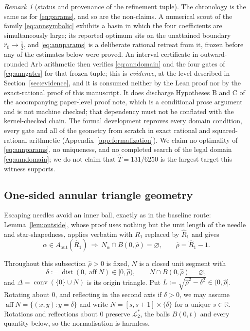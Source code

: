 \documentclass[11pt]{article}
\theoremstyle{plain}
\theoremstyle{definition}
\theoremstyle{remark}
\newtheorem{remark}[theorem]{Remark}
\newcommand{\R}{\mathbb{R}}
\newcommand{\Lout}{\mathcal{L}^{*}_{2}}
\newcommand{\conv}{\operatorname{conv}}
\newcommand{\Aout}{A_{\mathrm{out}}}
\begin{document}
\begin{remark}[status and provenance of the refinement tuple]\label{rem:annprov}
The chronology is the same as for \eqref{eq:params}, and so are the
non-claims. A numerical scout of the family
\eqref{eq:annsymbolic} exhibits a basin in which the four coefficients are
simultaneously large; its reported optimum sits on the unattained boundary
$\hat r_{0}\to\tfrac12$, and \eqref{eq:annparams} is a deliberate rational
retreat from it, frozen before any of the estimates below were proved. An
interval certificate in outward-rounded Arb arithmetic then verifies
\eqref{eq:anndomain} and the four gates of \eqref{eq:anngates} for that frozen
tuple; this is \emph{evidence}, at the level described in
Section~\ref{sec:evidence}, and it is consumed neither by the Lean proof nor by
the exact-rational proof of this manuscript. It does discharge Hypotheses B
and C of the accompanying paper-level proof note, which is a conditional prose
argument and is not machine checked; that dependency must not be conflated with
the kernel-checked chain. The formal development reproves every domain
condition, every gate and all of the geometry from scratch in exact rational and
squared-rational arithmetic (Appendix~\ref{app:formalization}). We claim no optimality of
\eqref{eq:annparams}, no uniqueness, and no completed search of the legal
domain \eqref{eq:anndomain}; we do not claim that $\hat T=131/6250$ is the
largest target this witness supports.
\end{remark}

\subsection{One-sided annular triangle geometry}\label{sec:anngeom}

Escaping needles avoid an inner ball, exactly as in the baseline route:
Lemma~\ref{lem:outside}, whose proof uses nothing but the unit length of the
needle and star-shapedness, applies verbatim with $R_{1}$ replaced by
$\hat R_{1}$ and gives
\begin{equation}\label{eq:annoutside}
  \alpha\in\Aout(\hat R_{1})\ \Longrightarrow\
  N_{\alpha}\cap B(0,\hat\rho)=\varnothing,
  \qquad \hat\rho=\hat R_{1}-1 .
\end{equation}

Throughout this subsection $\hat\rho>0$ is fixed, $N$ is a closed unit segment
with
\[
  \delta:=\operatorname{dist}(0,\operatorname{aff}N)\in[0,\hat\rho),
  \qquad
  N\cap B(0,\hat\rho)=\varnothing ,
\]
and $\Delta=\conv(\{0\}\cup N)$ is its origin triangle. Put
$L:=\sqrt{\hat\rho^{2}-\delta^{2}}\in(0,\hat\rho]$. Rotating about $0$, and
reflecting in the second axis if $\delta>0$, we may assume
$\operatorname{aff}N=\{(x,y):y=\delta\}$ and write $N=[s,s+1]\times\{\delta\}$
for a unique $s\in\R$. Rotations and reflections about $0$ preserve $\Lout$,
the balls $B(0,t)$ and every quantity below, so the normalisation is harmless.
\end{document}

